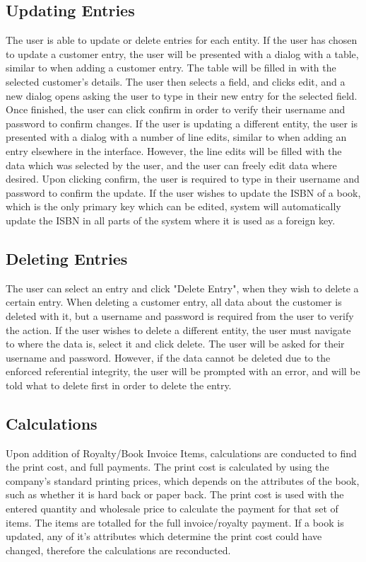 \subsection{Updating Entries}

The user is able to update or delete entries for each entity. If the user has chosen to update a customer entry, the user will be presented with a dialog with a table, similar to when adding a customer entry. The table will be filled in with the selected customer's details. The user then selects a field, and clicks edit, and a new dialog opens asking the user to type in their new entry for the selected field. Once finished, the user can click confirm in order to verify their username and password to confirm changes. If the user is updating a different entity, the user is presented with a dialog with a number of line edits, similar to when adding an entry elsewhere in the interface. However, the line edits will be filled with the data which was selected by the user, and the user can freely edit data where desired. Upon clicking confirm, the user is required to type in their username and password to confirm the update. If the user wishes to update the ISBN of a book, which is the only primary key which can be edited, system will automatically update the ISBN in all parts of the system where it is used as a foreign key.

\subsection{Deleting Entries}

The user can select an entry and click "Delete Entry", when they wish to delete a certain entry. When deleting a customer entry, all data about the customer is deleted with it, but a username and password is required from the user to verify the action. If the user wishes to delete a different entity, the user must navigate to where the data is, select it and click delete. The user will be asked for their username and password. However, if the data cannot be deleted due to the enforced referential integrity, the user will be prompted with an error, and will be told what to delete first in order to delete the entry.

\subsection{Calculations}

Upon addition of Royalty/Book Invoice Items, calculations are conducted to find the print cost, and full payments. The print cost is calculated by using the company's standard printing prices, which depends on the attributes of the book, such as whether it is hard back or paper back. The print cost is used with the entered quantity and wholesale price to calculate the payment for that set of items. The items are totalled for the full invoice/royalty payment. If a book is updated, any of it's attributes which determine the print cost could have changed, therefore the calculations are reconducted.

